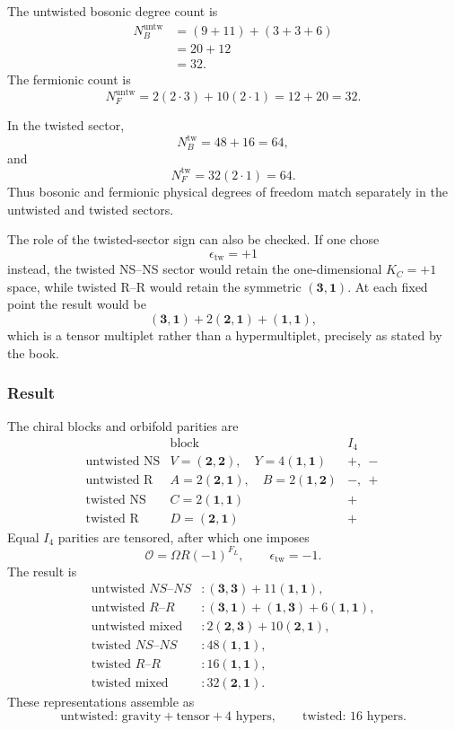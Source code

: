 \documentclass[
  10pt,
  a4paper,
  openany]{book}
\begin{document}
The untwisted bosonic degree count is \[
\begin{aligned}
N_B^{\mathrm{untw}}
&=
\left(9+11\right)
+
\left(3+3+6\right)\\
&=20+12\\
&=32.
\end{aligned}
\] The fermionic count is \[
N_F^{\mathrm{untw}}
=
2(2\cdot3)
+
10(2\cdot1)
=12+20
=32.
\]

In the twisted sector, \[
N_B^{\mathrm{tw}}
=48+16
=64,
\] and \[
N_F^{\mathrm{tw}}
=32(2\cdot1)
=64.
\] Thus bosonic and fermionic physical degrees of freedom match
separately in the untwisted and twisted sectors.

The role of the twisted-sector sign can also be checked. If one chose \[
\epsilon_{\mathrm{tw}}=+1
\] instead, the twisted NS--NS sector would retain the one-dimensional
\(K_C=+1\) space, while twisted R--R would retain the symmetric
\((\mathbf3,\mathbf1)\). At each fixed point the result would be \[
(\mathbf3,\mathbf1)
+
2(\mathbf2,\mathbf1)
+
(\mathbf1,\mathbf1),
\] which is a tensor multiplet rather than a hypermultiplet, precisely
as stated by the book.

\subsubsection{Result}\label{result-24}

The chiral blocks and orbifold parities are \[
\begin{array}{c|cc}
&\text{block}&I_4\\ \hline
\text{untwisted NS}
&V=(\mathbf2,\mathbf2),\quad Y=4(\mathbf1,\mathbf1)
&+,\ -\\
\text{untwisted R}
&A=2(\mathbf2,\mathbf1),\quad B=2(\mathbf1,\mathbf2)
&-,\ +\\
\text{twisted NS}
&C=2(\mathbf1,\mathbf1)
&+\\
\text{twisted R}
&D=(\mathbf2,\mathbf1)
&+
\end{array}
\] Equal \(I_4\) parities are tensored, after which one imposes \[
\mathcal O
=
\Omega R(-1)^{F_L},
\qquad
\epsilon_{\mathrm{tw}}=-1.
\] The result is \[
\boxed{
\begin{aligned}
\text{untwisted }NS\text{--}NS
&:
(\mathbf3,\mathbf3)
+
11(\mathbf1,\mathbf1),\\
\text{untwisted }R\text{--}R
&:
(\mathbf3,\mathbf1)
+
(\mathbf1,\mathbf3)
+
6(\mathbf1,\mathbf1),\\
\text{untwisted mixed}
&:
2(\mathbf2,\mathbf3)
+
10(\mathbf2,\mathbf1),\\
\text{twisted }NS\text{--}NS
&:
48(\mathbf1,\mathbf1),\\
\text{twisted }R\text{--}R
&:
16(\mathbf1,\mathbf1),\\
\text{twisted mixed}
&:
32(\mathbf2,\mathbf1).
\end{aligned}
}
\] These representations assemble as \[
\boxed{
\text{untwisted: gravity}+\text{tensor}+4\text{ hypers},
\qquad
\text{twisted: }16\text{ hypers}.
}
\]
\end{document}
